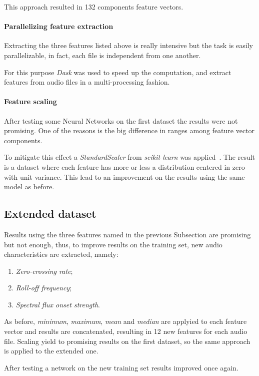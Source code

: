 This approach resulted in 132 components feature vectors.

\paragraph{Parallelizing feature extraction}
Extracting the three features listed above is really intensive 
but the task is easily parallelizable, in fact, each file is independent 
from one another.

For this purpose \emph{Dask} was used to speed up the computation, and 
extract features from audio files in a multi-processing fashion.~\cite{dask}

\paragraph{Feature scaling}
After testing some Neural Networks on the first dataset the results 
were not promising. One of the reasons is the big difference in 
ranges among feature vector components.

To mitigate this effect a \emph{StandardScaler} from \emph{scikit learn} was applied~\cite{scaler}.
The result is a dataset where each feature has more or less a distribution 
centered in zero with unit variance.
This lead to an improvement on the results using the same
model as before. 

\subsection{Extended dataset}
\label{extended-dataset}

Results using the three features named in the previous Subsection 
are promising but not enough, thus, to improve results on the training set, 
new audio characteristics are extracted, namely: 
\begin{enumerate}
    \item \emph{Zero-crossing rate};
    \item \emph{Roll-off frequency};
    \item \emph{Spectral flux onset strength}.
\end{enumerate}
As before, \emph{minimum}, \emph{maximum}, \emph{mean} 
and \emph{median} are applyied to each feature vector and 
results are concatenated, resulting in 12 new features for each 
audio file.
Scaling yield to promising results on the first dataset, 
so the same approach is applied to the extended one.

After testing a network on the new training set 
results improved once again.

